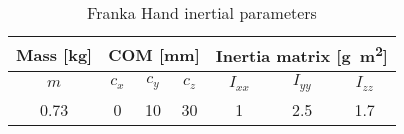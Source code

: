 \begin{table}
\centering
\caption{Franka Hand inertial parameters}
\label{tab:franka-hand}
\begin{tabular}{|c|ccc|ccc|} 
\hline
\textbf{Mass [\si{\kilo\gram}]} & \multicolumn{3}{c|}{\textbf{COM [\si{\milli\meter}]}} & \multicolumn{3}{c|}{\textbf{Inertia matrix [\si{\gram\meter\squared}]}} \\ 
\hline
$m$ & $c_x$ & $c_y$ & $c_z$ & $I_{xx}$ & $I_{yy}$ & $I_{zz}$ \\
0.73 & 0 & 10 & 30 & 1 & 2.5 & 1.7 \\
\hline
\end{tabular}
\end{table}